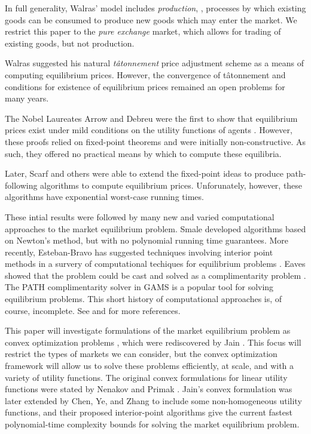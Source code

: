 \documentclass[12pt]{article}
\newcommand{\tatonnement}{t\^atonnement}
\begin{document}
In full generality, Walras' model includes \emph{production}, \ie, processes by
which existing goods can be consumed to produce new goods which may enter the
market. We restrict this paper to the \emph{pure exchange} market, which allows for
trading of existing goods, but not production.

Walras suggested his natural \emph{\tatonnement{}} price adjustment scheme as a
means of computing equilibrium prices. However, the convergence of
\tatonnement{} and conditions for existence of equilibrium prices remained an
open problems for many years.

The Nobel Laureates Arrow and Debreu were the first to show that equilibrium
prices exist under mild conditions on the utility functions of agents
\cite{arrow1954existence}. However, these proofs relied on fixed-point theorems
\cite[see][]{border1989fixed}
and were initially non-constructive.
As such, they offered no practical means by which to compute these equilibria.

Later, Scarf and others 
\cite{scarf1967approximation,scarf1973computation,
scarf1982computation,eaves1972homotopies} were able to extend the fixed-point
ideas to produce path-following algorithms to compute equilibrium prices.
Unforunately, however, these algorithms have exponential worst-case running times.

These intial results were followed by many new and varied computational
approaches to the market equilibrium problem.
Smale \cite{smale1976exchange,smale1976convergent} developed algorithms based
on Newton's method, but with no polynomial running time guarantees.
More recently, Esteban-Bravo has suggested techniques involving
interior point methods in a survery of computational techiques
for equilibrium problems \cite{esteban2004computing}.
Eaves \cite{eaves1976finite} showed that the problem could be cast and solved
as a complimentarity problem \cite{isac1992complementarity}. The PATH
\cite{ferris2008path,ferris2000complementarity,ferris2000homotopy}
complimentarity solver in GAMS \cite{rosenthal2004gams} is a popular tool for
solving equilibrium problems.
This short history of computational approaches is, of course, incomplete.
See \cite{codenotti2008experimental} and \cite{nisan2007algorithmic}
for more references.

This paper will investigate formulations of the market equilibrium problem as
convex optimization problems \cite{BoV:04}, which were rediscovered by Jain
\cite{jain2007polynomial}. This focus will restrict the types of markets we can
consider, but the convex optimization framework will allow us to solve these
problems efficiently, at scale, and with a variety of utility functions. The
original convex formulations for linear utility functions were stated by
Nenakov and Primak \cite{nenakov1983algorithm}. Jain's convex formulation was
later extended by Chen, Ye, and Zhang \cite{chen2007note,
chen2010equilibrium,ye2008path} to include some non-homogeneous utility
functions, and their proposed interior-point algorithms give the current
fastest polynomial-time complexity bounds for solving the market equilibrium
problem.
\end{document}
